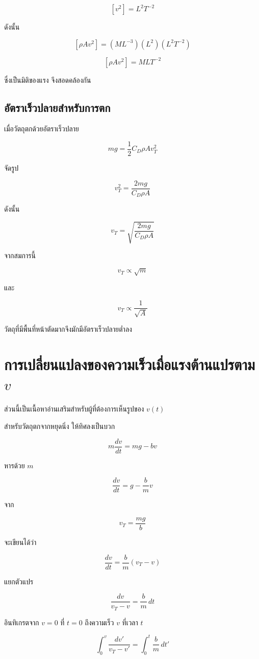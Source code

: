 \[
[v^2]=L^2T^{-2}
\]

ดังนั้น

\[
[\rho Av^2]
=
(ML^{-3})(L^2)(L^2T^{-2})
\]

\[
[\rho Av^2]
=
MLT^{-2}
\]

ซึ่งเป็นมิติของแรง จึงสอดคล้องกัน

\subsection{อัตราเร็วปลายสำหรับการตก}

เมื่อวัตถุตกด้วยอัตราเร็วปลาย

\[
mg
=
\frac{1}{2}C_D\rho A v_T^2
\]

จัดรูป

\[
v_T^2
=
\frac{2mg}{C_D\rho A}
\]

ดังนั้น

\[
\boxed{
v_T
=
\sqrt{\frac{2mg}{C_D\rho A}}
}
\]

จากสมการนี้

\[
v_T\propto\sqrt{m}
\]

และ

\[
v_T\propto\frac{1}{\sqrt{A}}
\]

วัตถุที่มีพื้นที่หน้าตัดมากจึงมักมีอัตราเร็วปลายต่ำลง

\section{การเปลี่ยนแปลงของความเร็วเมื่อแรงต้านแปรตาม $v$}

ส่วนนี้เป็นเนื้อหาอ่านเสริมสำหรับผู้ที่ต้องการเห็นรูปของ $v(t)$

สำหรับวัตถุตกจากหยุดนิ่ง ให้ทิศลงเป็นบวก

\[
m\frac{dv}{dt}=mg-bv
\]

หารด้วย $m$

\[
\frac{dv}{dt}
=
g-\frac{b}{m}v
\]

จาก

\[
v_T=\frac{mg}{b}
\]

จะเขียนได้ว่า

\[
\frac{dv}{dt}
=
\frac{b}{m}(v_T-v)
\]

แยกตัวแปร

\[
\frac{dv}{v_T-v}
=
\frac{b}{m}\,dt
\]

อินทิเกรตจาก $v=0$ ที่ $t=0$
ถึงความเร็ว $v$ ที่เวลา $t$

\[
\int_0^v
\frac{dv'}{v_T-v'}
=
\int_0^t
\frac{b}{m}\,dt'
\]

